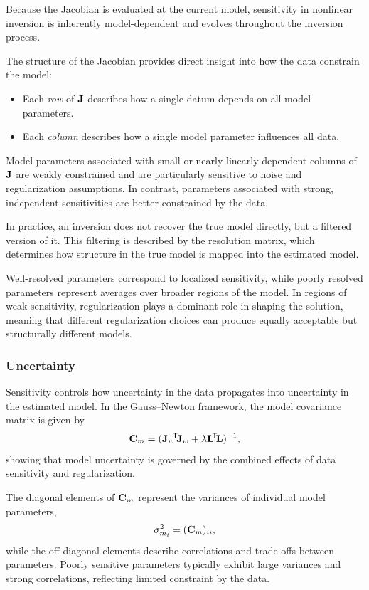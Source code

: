 Because the Jacobian is evaluated at the current model, sensitivity in nonlinear inversion is inherently model-dependent and evolves throughout the inversion process.

The structure of the Jacobian provides direct insight into how the data constrain the model:
\begin{itemize}
    \item Each \emph{row} of $\vb{J}$ describes how a single datum depends on all model parameters.
    \item Each \emph{column} describes how a single model parameter influences all data.
\end{itemize}

Model parameters associated with small or nearly linearly dependent columns of $\vb{J}$ are weakly constrained and are particularly sensitive to noise and regularization assumptions. In contrast, parameters associated with strong, independent sensitivities are better constrained by the data.

In practice, an inversion does not recover the true model directly, but a filtered version of it. This filtering is described by the resolution matrix, which determines how structure in the true model is mapped into the estimated model.

Well-resolved parameters correspond to localized sensitivity, while poorly resolved parameters represent averages over broader regions of the model. In regions of weak sensitivity, regularization plays a dominant role in shaping the solution, meaning that different regularization choices can produce equally acceptable but structurally different models.

\subsubsection{Uncertainty}

Sensitivity controls how uncertainty in the data propagates into uncertainty in the estimated model. In the Gauss--Newton framework, the model covariance matrix is given by
\[
    \vb{C}_m = (\vb{J}_w\!^\mathsf{T}\! \vb{J}_w + \lambda \vb{L}\!^\mathsf{T}\! \vb{L})^{-1},
\]
showing that model uncertainty is governed by the combined effects of data sensitivity and regularization.

The diagonal elements of $\vb{C}_m$ represent the variances of individual model parameters,
\[
    \sigma_{m_i}^2 = (\vb{C}_m)_{ii},
\]
while the off-diagonal elements describe correlations and trade-offs between parameters. Poorly sensitive parameters typically exhibit large variances and strong correlations, reflecting limited constraint by the data.

